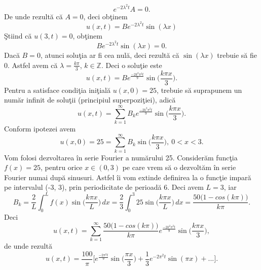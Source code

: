 \documentclass[a4paper,openany,12pt]{report}
\begin{document}
\begin{equation*}
e^{-2\lambda^2t}A=0.
\end{equation*}
De unde rezult\u a c\u a $A=0$, deci ob\c tinem
\begin{equation*}
u(x,t)=B e^{-2\lambda^2t}\sin(\lambda x)
\end{equation*}
\c Stiind c\u a $u(3, t)=0$, ob\c tinem
\begin{equation*}
Be^{-2\lambda^2t}\sin(\lambda x)=0.
\end{equation*}
Dac\u a $B=0$, atunci solu\c tia ar fi cea nul\u a, deci rezult\u a c\u a $\sin(\lambda x)$ trebuie s\u a fie 0. Astfel avem c\u a $\lambda=\frac{k\pi}{3}$, $k \in \mathbb{Z}$. Deci o solu\c tie este
\begin{equation*}
u(x,t)=B e^{\frac{-2k^2\pi^2t}{9}}\sin\Big(\frac{k\pi x}{3}\Big).
\end{equation*} 
Pentru a satisface condi\c tia ini\c tial\u a $u(x,0)=25$, trebuie s\u a suprapunem un num\u ar infinit de solu\c tii (principiul superpozi\c tiei), adic\u a
\begin{equation*}
u(x,t)=\sum_{k=1}^\infty B_k e^{\frac{-2k^2\pi^2t}{9}}\sin\Big(\frac{k\pi x}{3}\Big).
\end{equation*}
Conform ipotezei avem
\begin{equation*}
u(x,0)=25=\sum_{k=1}^\infty B_k\sin\Big(\frac{k\pi x}{3}\Big), \: 0<x<3.
\end{equation*}
Vom folosi dezvoltarea \^ in serie Fourier a num\u arului 25. Consider\u am func\c tia $f(x)=25$, pentru orice $x \in (0,3)$ pe care vrem s\u a o dezvolt\u am \^ in serie Fourier numai dup\u a sinusuri. Astfel \^ ii vom extinde definirea la o func\c tie impar\u a pe intervalul (-3, 3), prin periodicitate de perioad\u a 6. Deci avem $L=3$, iar
\begin{equation*}
B_k=\frac{2}{L}\int_0^Lf(x)\sin\Big(\frac{k\pi x}{L}\Big)\, dx=\frac{2}{3}\int_0^3 25\sin\Big(\frac{k\pi x}{L}\Big)\, dx = \frac{50\big(1-cos(k\pi)\big)}{k\pi}.
\end{equation*}
Deci
\begin{equation*}
u(x,t)=\sum_{k=1}^\infty\frac{50\big(1-cos(k\pi)\big)}{k\pi}e^{\frac{-2k^2\pi^2t}{9}}\sin\Big(\frac{k\pi x}{3}\Big),
\end{equation*}
de unde rezult\u a
\begin{equation*}
u(x,t)=\frac{100}{\pi}\Big[e^{\frac{-2\pi^2t}{9}}\sin\Big(\frac{\pi x}{3}\Big)+ \frac{1}{3}e^{-2\pi^2t}\sin(\pi x)+...\Big].
\end{equation*}
\end{document}
